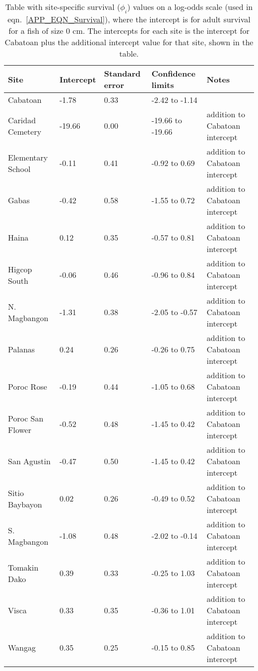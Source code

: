 \documentclass[12pt, oneside]{article}   	%
\begin{document}
\begin{table}[!htbp] 
\begin{centering}
\caption{Table with site-specific survival ($\phi_i$) values on a log-odds scale (used in eqn.\ \ref{APP_EQN_Survival}), where the intercept is for adult survival for a fish of size 0 cm. The intercepts for each site is the intercept for Cabatoan plus the additional intercept value for that site, shown in the table.} \label{APP_TAB_SiteSurvivals}
\begin{tabular}{|p{1.1in}|p{0.75in}|p{0.75in}|p{1.25in}|p{1.5in}|}
\hline 
\textbf{Site} & \textbf{Intercept} & \textbf{Standard error} & \textbf{Confidence limits} & \textbf{Notes} \\ \hline
Cabatoan & -1.78 & 0.33 & -2.42 to -1.14 & \\ \hline
Caridad Cemetery & -19.66 & 0.00 & -19.66 to -19.66 & addition to Cabatoan intercept \\ \hline
Elementary School & -0.11 & 0.41 & -0.92 to 0.69 & addition to Cabatoan intercept \\ \hline
Gabas & -0.42 & 0.58 & -1.55 to 0.72 & addition to Cabatoan intercept \\ \hline
Haina & 0.12 & 0.35 & -0.57 to 0.81 & addition to Cabatoan intercept \\ \hline
Higcop South & -0.06 & 0.46 & -0.96 to 0.84 & addition to Cabatoan intercept \\ \hline
N. Magbangon & -1.31 & 0.38 & -2.05 to -0.57 & addition to Cabatoan intercept \\ \hline
Palanas & 0.24 & 0.26 & -0.26 to 0.75 & addition to Cabatoan intercept \\ \hline
Poroc Rose & -0.19 & 0.44 & -1.05 to 0.68 & addition to Cabatoan intercept \\ \hline
Poroc San Flower & -0.52 & 0.48 & -1.45 to 0.42 & addition to Cabatoan intercept \\ \hline
San Agustin & -0.47 & 0.50 & -1.45 to 0.42 & addition to Cabatoan intercept \\ \hline
Sitio Baybayon & 0.02 & 0.26 & -0.49 to 0.52 & addition to Cabatoan intercept \\ \hline
S. Magbangon & -1.08 & 0.48 & -2.02 to -0.14 & addition to Cabatoan intercept \\ \hline
Tomakin Dako & 0.39 & 0.33 & -0.25 to 1.03 & addition to Cabatoan intercept \\ \hline
Visca & 0.33 & 0.35 & -0.36 to 1.01 & addition to Cabatoan intercept \\ \hline
Wangag & 0.35 & 0.25 & -0.15 to 0.85 & addition to Cabatoan intercept \\ \hline
\end{tabular}
\end{centering}
\end{table}
\end{document}
